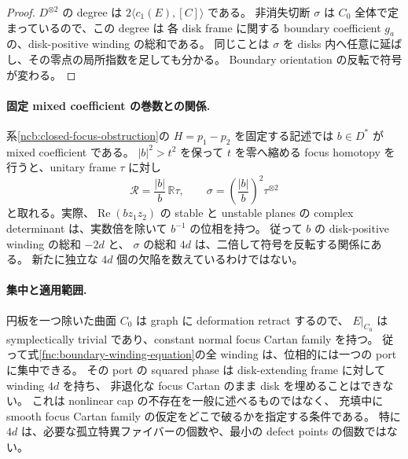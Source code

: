\begin{proof}
$D^{\otimes2}$ の degree は $2\langle c_1(E),[C]\rangle$ である。
非消失切断 $\sigma$ は $C_0$ 全体で定まっているので、この degree は
各 disk frame に関する boundary coefficient $g_a$ の、disk-positive winding の総和である。
同じことは $\sigma$ を disks 内へ任意に延ばし、その零点の局所指数を足しても分かる。
Boundary orientation の反転で符号が変わる。
\end{proof}

\paragraph{固定 mixed coefficient の巻数との関係.}
系\ref{ncb:closed-focus-obstruction}の $H=p_1-p_2$ を固定する記述では
$b\in D^*$ が mixed coefficient である。
$|b|^2>t^2$ を保って $t$ を零へ縮める focus homotopy を行うと、unitary frame $\tau$ に対し
\[
 \mathcal R=\frac{|b|}{b}\,\mathbb R\tau,
 \qquad
 \sigma=\left(\frac{|b|}{b}\right)^2\tau^{\otimes2}
\]
と取れる。実際、$\operatorname{Re}(b z_1z_2)$ の stable と unstable planes の
complex determinant は、実数倍を除いて $b^{-1}$ の位相を持つ。
従って $b$ の disk-positive winding の総和 $-2d$ と、
$\sigma$ の総和 $4d$ は、二倍して符号を反転する関係にある。
新たに独立な $4d$ 個の欠陥を数えているわけではない。

\paragraph{集中と適用範囲.}
円板を一つ除いた曲面 $C_0$ は graph に deformation retract するので、
$E|_{C_0}$ は symplectically trivial であり、constant normal focus Cartan family を持つ。
従って式\eqref{fnc:boundary-winding-equation}の全 winding は、位相的には一つの port に集中できる。
その port の squared phase は disk-extending frame に対して winding $4d$ を持ち、
非退化な focus Cartan のまま disk を埋めることはできない。
これは nonlinear cap の不存在を一般に述べるものではなく、
充填中に smooth focus Cartan family の仮定をどこで破るかを指定する条件である。
特に $4d$ は、必要な孤立特異ファイバーの個数や、最小の defect points の個数ではない。
